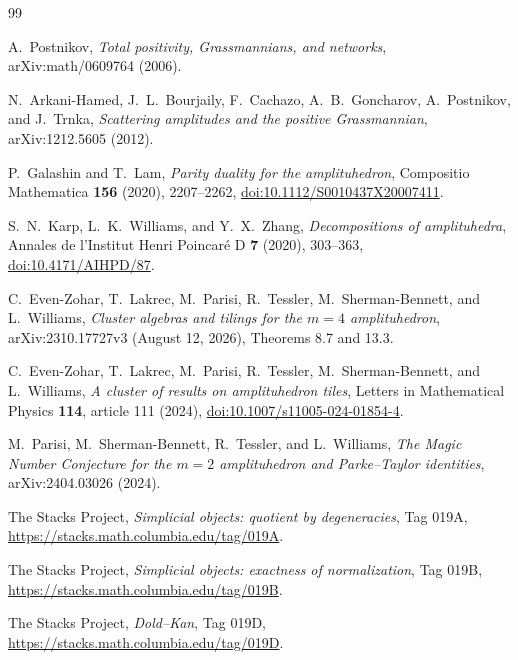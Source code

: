 \documentclass[11pt]{article}
\newcommand{\1}{\mathbf 1}
\begin{document}
\begin{thebibliography}{99}

A.~Postnikov,
\emph{Total positivity, Grassmannians, and networks},
arXiv:math/0609764 (2006).

N.~Arkani-Hamed, J.~L.~Bourjaily, F.~Cachazo, A.~B.~Goncharov,
A.~Postnikov, and J.~Trnka,
\emph{Scattering amplitudes and the positive Grassmannian},
arXiv:1212.5605 (2012).

P.~Galashin and T.~Lam,
\emph{Parity duality for the amplituhedron},
Compositio Mathematica \textbf{156} (2020), 2207--2262,
\href{https://doi.org/10.1112/S0010437X20007411}{doi:10.1112/S0010437X20007411}.

\begingroup\raggedright
S.~N.~Karp, L.~K.~Williams, and Y.~X.~Zhang,
\emph{Decompositions of amplituhedra},
Annales de l'Institut Henri Poincar\'e D \textbf{7} (2020), 303--363,
\href{https://doi.org/10.4171/AIHPD/87}{doi:10.4171/AIHPD/87}.
\par\endgroup

C.~Even-Zohar, T.~Lakrec, M.~Parisi, R.~Tessler,
M.~Sherman-Bennett, and L.~Williams,
\emph{Cluster algebras and tilings for the $m=4$ amplituhedron},
arXiv:2310.17727v3 (August 12, 2026), Theorems 8.7 and 13.3.

C.~Even-Zohar, T.~Lakrec, M.~Parisi, R.~Tessler,
M.~Sherman-Bennett, and L.~Williams,
\emph{A cluster of results on amplituhedron tiles},
Letters in Mathematical Physics \textbf{114}, article 111 (2024),
\href{https://doi.org/10.1007/s11005-024-01854-4}{doi:10.1007/s11005-024-01854-4}.

M.~Parisi, M.~Sherman-Bennett, R.~Tessler, and L.~Williams,
\emph{The Magic Number Conjecture for the $m=2$ amplituhedron and
Parke--Taylor identities},
arXiv:2404.03026 (2024).

The Stacks Project,
\emph{Simplicial objects: quotient by degeneracies},
Tag 019A, \url{https://stacks.math.columbia.edu/tag/019A}.

The Stacks Project,
\emph{Simplicial objects: exactness of normalization},
Tag 019B, \url{https://stacks.math.columbia.edu/tag/019B}.

The Stacks Project,
\emph{Dold--Kan},
Tag 019D, \url{https://stacks.math.columbia.edu/tag/019D}.

\end{thebibliography}
\end{document}
